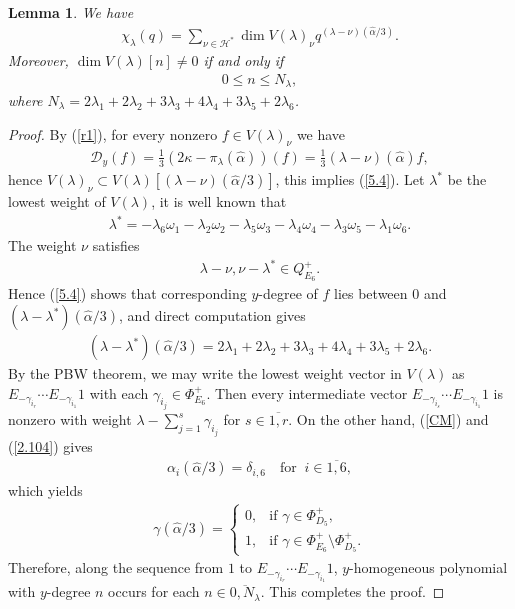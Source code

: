 \documentclass[12pt]{article}
\numberwithin{equation}{section}
\newtheorem{lemma}[theorem]{Lemma}
\theoremstyle{definition}
\theoremstyle{remark}
\begin{document}
\begin{lemma}\label{Lem5.1}
	We have
	\begin{eqnarray}
		\chi_\lambda(q)=\sum_{\nu\in \mathscr{H}^*}\dim V(\lambda)_\nu q^{(\lambda-\nu)(\widehat{\alpha}/3)}. \label{5.4}
	\end{eqnarray}
	Moreover, $\dim V(\lambda)[n]\neq 0$ if and only if
	\begin{eqnarray}
		0\leqslant n\leqslant N_\lambda, \label{5.5}
	\end{eqnarray}
	where $N_\lambda=2\lambda_1+2\lambda_2+3\lambda_3+4\lambda_4+3\lambda_5+2\lambda_6$.
\end{lemma}
\begin{proof}
	By (\ref{r1}), for every nonzero $f\in V(\lambda)_\nu$ we have
	\begin{eqnarray*}
		\mathcal{D}_y(f)=\frac{1}{3}(2\kappa-\pi_{\lambda}(\widehat{\alpha}))(f)=\frac{1}{3}(\lambda-\nu)(\widehat{\alpha})f,
	\end{eqnarray*}
	hence $V(\lambda)_\nu\subset V(\lambda)[(\lambda-\nu)(\widehat{\alpha}/3)]$, this implies (\ref{5.4}). Let $\lambda^*$ be the lowest weight of $V(\lambda)$, it is well known that 
	\begin{eqnarray}
		\lambda^*=-\lambda_6\omega_1-\lambda_2\omega_2-\lambda_5\omega_3-\lambda_4\omega_4-\lambda_3\omega_5-\lambda_1\omega_6.
	\end{eqnarray}
	The weight $\nu$ satisfies
	\begin{eqnarray}
		\lambda-\nu, \nu-\lambda^*\in Q^{+}_{E_6}. \label{5.6}
	\end{eqnarray}
	Hence (\ref{5.4}) shows that corresponding $y$-degree of $f$ lies between $0$ and $(\lambda-\lambda^*)(\widehat{\alpha}/3)$, and direct computation gives 
	\begin{eqnarray}
		(\lambda-\lambda^*)(\widehat{\alpha}/3)=2\lambda_1+2\lambda_2+3\lambda_3+4\lambda_4+3\lambda_5+2\lambda_6.
	\end{eqnarray}
	By the PBW theorem, we may write the lowest weight vector in $V(\lambda)$ as $E_{-\gamma_{i_r}}\cdots E_{-\gamma_{i_1}}1$ with each $\gamma_{i_j}\in\Phi_{E_6}^+$. Then every intermediate vector $E_{-\gamma_{i_s}}\cdots E_{-\gamma_{i_1}}1$ is nonzero with weight $\lambda-\sum_{j=1}^{s}\gamma_{i_j}$ for $s\in\overline{1,r}$. On the other hand, (\ref{CM}) and (\ref{2.104}) gives
	\begin{eqnarray}
		\alpha_i(\widehat{\alpha}/3)=\delta_{i,6} \quad\text{for}\;\; i\in\overline{1,6}, \label{5.9}
	\end{eqnarray}
	which yields
	\begin{align}
		\gamma(\widehat{\alpha}/3)=\begin{cases}
			0,&\text{if }\gamma\in\Phi_{D_5}^+,\\
			1,&\text{if }\gamma\in\Phi_{E_6}^{+}\setminus\Phi_{D_5}^{+}.
		\end{cases}\label{5.10}
	\end{align}
	 Therefore, along the sequence from $1$ to $E_{-\gamma_{i_r}}\cdots E_{-\gamma_{i_1}}1$, $y$-homogeneous polynomial with $y$-degree $n$ occurs for each $n\in\overline{0,N_\lambda}$. This completes the proof.
\end{proof}
\end{document}
